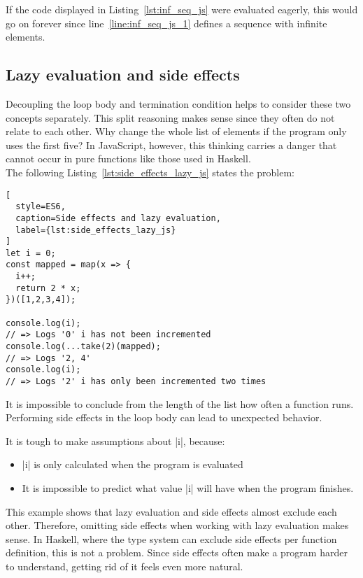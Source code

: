 If the code displayed in Listing~\ref{lst:inf_seq_js} were evaluated eagerly,
this would go on forever since line~\ref{line:inf_seq_js_1} defines a sequence
with infinite elements. \\ 

\subsection{Lazy evaluation and side effects} %
\label{sub:Lazy Evaluation and Side Effects}
Decoupling the loop body and termination condition helps to consider these two
concepts separately. This split reasoning makes sense since they often do not
relate to each other. Why change the whole list of elements if the program only
uses the first five? In JavaScript, however, this thinking carries a danger
that cannot occur in pure functions like those used in Haskell. \\ 
The following Listing~\ref{lst:side_effects_lazy_js} states the problem:

\begin{lstlisting}[
  style=ES6,
  caption=Side effects and lazy evaluation,
  label={lst:side_effects_lazy_js}
]
let i = 0;
const mapped = map(x => {
  i++;
  return 2 * x;
})([1,2,3,4]);

console.log(i);
// => Logs '0' i has not been incremented
console.log(...take(2)(mapped);
// => Logs '2, 4' 
console.log(i);
// => Logs '2' i has only been incremented two times
\end{lstlisting}

It is impossible to conclude from the length of the list how often a function
runs. Performing side effects in the loop body can lead to unexpected behavior. 

It is tough to make assumptions about |i|, because:
\begin{itemize}
  \item |i| is only calculated when the program is evaluated
  \item It is impossible to predict what value |i| will have when the program
    finishes.
\end{itemize}
This example shows that lazy evaluation and side effects almost exclude each
other. Therefore, omitting side effects when working with lazy evaluation makes
sense. In Haskell, where the type system can exclude side effects per function
definition, this is not a problem. Since side effects often make a program
harder to understand, getting rid of it feels even more natural.

